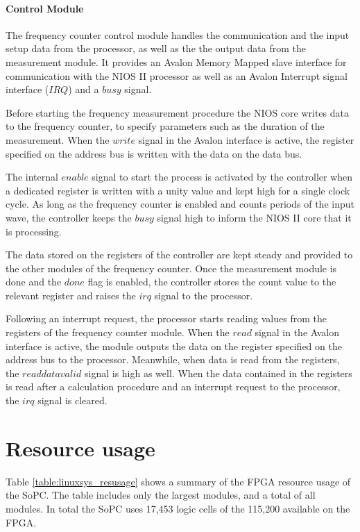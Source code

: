 \paragraph{Control Module}
The frequency counter control module handles the communication and the input setup data from the processor, as well as the the output data from the measurement module. It provides an Avalon Memory Mapped slave interface for communication with the NIOS II processor as well as an Avalon Interrupt signal interface ($IRQ$) and a $busy$ signal.

Before starting the frequency measurement procedure the NIOS core writes data to the frequency counter, to specify parameters such as the duration of the measurement. When the $write$ signal in the Avalon interface is active, the register specified on the address bus is written with the data on the data bus.

The internal $enable$ signal to start the process is activated by the controller when a dedicated register is written with a unity value and kept high for a single clock cycle. As long as the frequency counter is enabled and counts periods of the input wave, the controller keeps the $busy$ signal high to inform the NIOS II core that it is processing.

The data stored on the registers of the controller are kept steady and provided to the other modules of the frequency counter. Once the measurement module is done and the $done$ flag is enabled, the controller stores the count value to the relevant register and raises the $irq$ signal to the processor.

Following an interrupt request, the processor starts reading values from the registers of the frequency counter module. When the $read$ signal in the Avalon interface is active, the module outputs the data on the register specified on the address bus to the processor. Meanwhile, when data is read from the registers, the $readdatavalid$ signal is high as well. When the data contained in the registers is read after a calculation procedure and an interrupt request to the processor, the $irq$ signal is cleared.


\newpage
\section{Resource usage}
Table \ref{table:linuxsys_resusage} shows a summary of the FPGA resource usage of the SoPC. The table includes only
the largest modules, and a total of all modules. In total the SoPC uses 17,453 logic cells of the
115,200 available on the FPGA.

